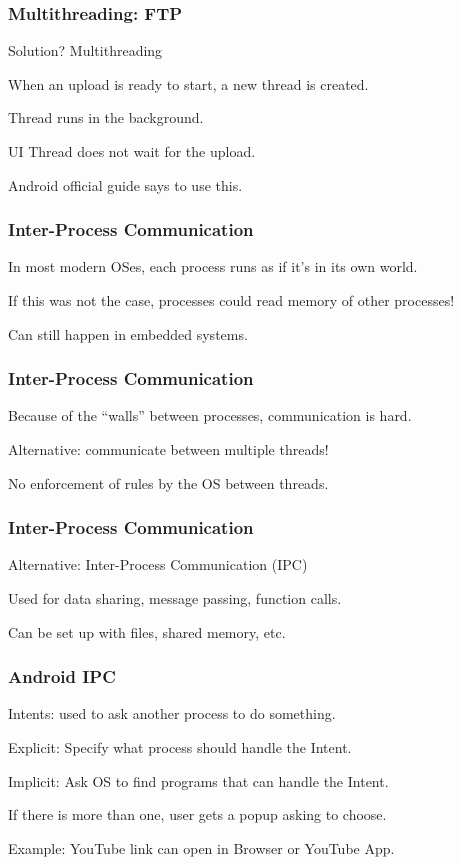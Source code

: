 \begin{frame}
\frametitle{Multithreading: FTP}
\begin{changemargin}{1cm}
Solution? Multithreading

When an upload is ready to start, a new thread is created.

Thread runs in the background.

UI Thread does not wait for the upload.

Android official guide says to use this.

\end{changemargin}
\end{frame}

\begin{frame}
\frametitle{Inter-Process Communication}
\begin{changemargin}{1cm}
In most modern OSes, each process runs as if it's in its own world.

If this was not the case, processes could read memory of other processes!

Can still happen in embedded systems.
\end{changemargin}
\end{frame}

\begin{frame}
\frametitle{Inter-Process Communication}
\begin{changemargin}{1cm}
Because of the ``walls'' between processes, communication is hard.

Alternative: communicate between multiple threads!

No enforcement of rules by the OS between threads.
\end{changemargin}
\end{frame}

\begin{frame}
\frametitle{Inter-Process Communication}
\begin{changemargin}{1cm}
Alternative: \alert{Inter-Process Communication} (IPC)

Used for data sharing, message passing, function calls.

Can be set up with files, shared memory, etc.

\end{changemargin}
\end{frame}

\begin{frame}
\frametitle{Android IPC}
\begin{changemargin}{1cm}
\alert{Intents}: used to ask another process to do something.

Explicit: Specify what process should handle the Intent.

Implicit: Ask OS to find programs that can handle the Intent.

If there is more than one, user gets a popup asking to choose.

Example: YouTube link can open in Browser or YouTube App.

\end{changemargin}
\end{frame}

